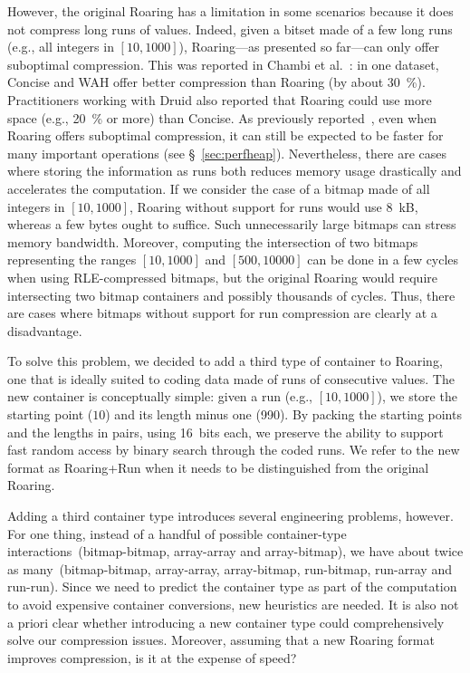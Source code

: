 \documentclass[times]{speauth}
\begin{document}
However, the original Roaring has a limitation in some scenarios because it does not compress long runs of values.  Indeed, given a bitset made of a few long runs (e.g., all integers in $[10,1000]$), Roaring---as presented so far---can only offer suboptimal compression. This was reported in Chambi et al.~\cite{SPE:SPE2325}: in one dataset, Concise and WAH offer better compression than Roaring (by about \SI{30}{\percent}). Practitioners working with
Druid also reported  that  Roaring could use more space (e.g., \SI{20}{\percent} or more) than Concise. As previously reported~\cite{SPE:SPE2325}, even when Roaring offers suboptimal compression, it can still be expected to be faster for many important operations (see \S~\ref{sec:perfheap}). Nevertheless,
there are cases where storing the information as runs  both reduces memory usage drastically and accelerates the computation. If we consider the case of a bitmap made of all integers in $[10,1000]$,
Roaring without support for runs would use \SI{8}{kB}, whereas a few bytes ought to suffice. Such unnecessarily large bitmaps can stress memory bandwidth. Moreover, computing the intersection of two bitmaps representing the ranges
$[10,1000]$ and $[500,10000]$ can be done in a few cycles when using RLE-compressed bitmaps, but the original Roaring
 would require intersecting two bitmap containers and possibly thousands of cycles. Thus, there are cases where bitmaps without support for run compression are clearly at a disadvantage.


To solve this problem, we decided to add a third type of container to Roaring, one that is ideally suited to coding data made of runs of consecutive values. The new container is conceptually simple: given a run (e.g.,  $[10,1000]$), we  store the starting point ($10$) and its length minus one (990).
By packing the starting points and the lengths in pairs, using 16~bits each, we preserve the ability to support fast random access by
binary search
through the coded runs. We refer to the new format as Roaring+Run when it needs to be  distinguished from the original Roaring. 



Adding a third container type introduces several engineering problems, however. For one thing, instead of a handful of possible container-type interactions~(bitmap-bitmap, array-array and array-bitmap), we have about twice as many~(bitmap-bitmap, array-array, array-bitmap, run-bitmap, run-array and run-run).
Since
we need to predict the container type as part of the computation to avoid expensive container conversions, new heuristics are needed.
It is also not a priori clear whether introducing a new container type could comprehensively solve our compression issues.
Moreover, assuming that a new Roaring format improves compression, is it at the expense of speed?
\end{document}
